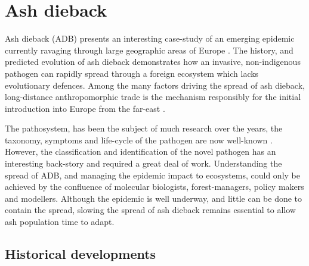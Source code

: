 \section{Ash dieback}




\label{ch2:ash-dieback}
Ash dieback (ADB) presents an interesting case-study of an emerging epidemic currently ravaging through large geographic areas of Europe \cite{enderle2019overview}.
The history, and predicted evolution of ash dieback demonstrates how an invasive, non-indigenous pathogen can rapidly spread through a foreign ecosystem which lacks evolutionary defences.
Among the many factors driving the spread of ash dieback, long-distance anthropomorphic trade is the mechanism responsibly for the initial introduction into Europe from the far-east \cite{zhao2013hymenoscyphus, queloz2011cryptic}.

The pathosystem, has been the subject of much research over the years, the taxonomy, symptoms and life-cycle of the pathogen are now well-known \cite{https://doi.org/10.1111/mpp.12073}.
However, the classification and identification of the novel pathogen has an interesting back-story and required a great deal of work.
Understanding the spread of ADB, and managing the epidemic impact to ecosystems, could only be achieved by the confluence of molecular biologists, forest-managers, policy makers and modellers.
Although the epidemic is well underway, and little can be done to contain the spread, slowing the spread of ash dieback remains essential to allow ash population time to adapt.

\subsection{Historical developments}

